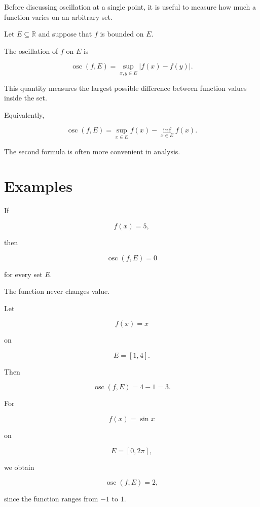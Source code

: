 \documentclass{essay}
\begin{document}
Before discussing oscillation at a single point, it is useful to measure how
much a function varies on an arbitrary set.

\begin{definition}

Let $E\subseteq\mathbb{R}$ and suppose that $f$ is bounded on $E$.

The oscillation of $f$ on $E$ is

\[
\operatorname{osc}(f,E)
=
\sup_{x,y\in E}|f(x)-f(y)|.
\]

\end{definition}

This quantity measures the largest possible difference between function values
inside the set.

Equivalently,

\[
\operatorname{osc}(f,E)
=
\sup_{x\in E}f(x)
-
\inf_{x\in E}f(x).
\]

The second formula is often more convenient in analysis.


\section{Examples}

\begin{example}

If

\[
f(x)=5,
\]

then

\[
\operatorname{osc}(f,E)=0
\]

for every set $E$.

The function never changes value.

\end{example}

\begin{example}

Let

\[
f(x)=x
\]

on

\[
E=[1,4].
\]

Then

\[
\operatorname{osc}(f,E)=4-1=3.
\]

\end{example}

\begin{example}

For

\[
f(x)=\sin x
\]

on

\[
E=[0,2\pi],
\]

we obtain

\[
\operatorname{osc}(f,E)=2,
\]

since the function ranges from $-1$ to $1$.

\end{example}
\end{document}
